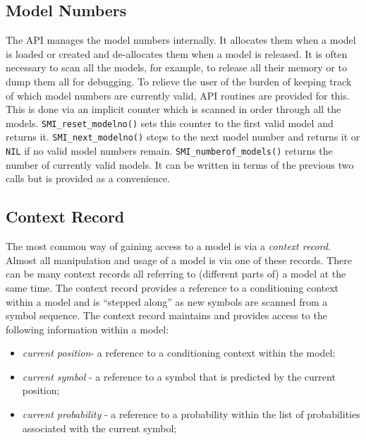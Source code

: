 \documentclass[11pt]{article}
\begin{document}
\subsection{Model Numbers}

The API manages the model numbers internally. It allocates them when a model
is loaded or created and de-allocates them when a model is released. It is
often necessary to scan all the models, for example, to release all their
memory or to dump them all for debugging. To relieve the user of the burden
of keeping track of which model numbers are currently valid, API
routines are provided for this. This is done via an implicit counter which
is scanned in order through all the models. \verb|SMI_reset_modelno()| sets
this counter to the first valid model and returns it.
\verb|SMI_next_modelno()| steps to the next model number and returns it or
\verb|NIL| if no valid model numbers remain. \verb|SMI_numberof_models()|
returns the number of currently valid models. It can be written in terms of
the previous two calls but is provided as a convenience.

\subsection{Context Record}

\label{section.context-record}

The most common way of gaining access to a model is via a \emph{context
record}. Almost all manipulation and usage of a model is via one of these
records. There can be many context records all referring to (different parts
of) a model at the same time. The context record provides a reference to a
conditioning context within a model and is ``stepped along'' as new symbols
are scanned from a symbol sequence. The context record maintains and
provides access to the following information within a model:

\begin{itemize}
\item  \emph{current position}- a reference to a conditioning context within
the model;

\item  \emph{current symbol} - a reference to a symbol that is predicted by
the current position;

\item  \emph{current probability} - a reference to a probability within the
list of probabilities associated with the current symbol;
\end{itemize}
\end{document}
